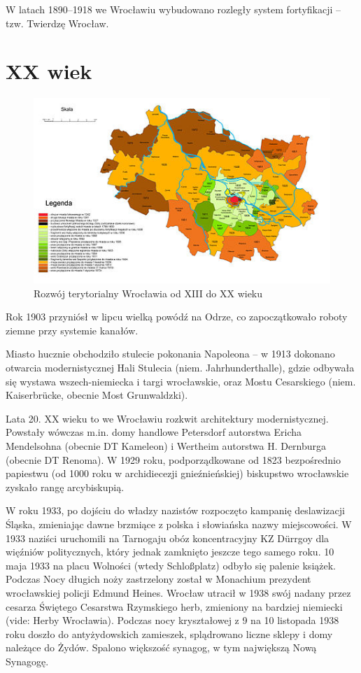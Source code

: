 \documentclass{article}
\begin{document}
W latach 1890–1918 we Wrocławiu wybudowano rozległy system fortyfikacji – tzw. Twierdzę Wrocław.

\section{XX wiek}
\hrulefill
 \begin{figure}[h!]
\centering
\includegraphics[scale=1]{12.jpg}
\caption{Rozwój terytorialny Wrocławia od XIII do XX wieku}
\end{figure}

Rok 1903 przyniósł w lipcu wielką powódź na Odrze, co zapoczątkowało roboty ziemne przy systemie kanałów.

Miasto hucznie obchodziło stulecie pokonania Napoleona – w 1913 dokonano otwarcia modernistycznej Hali Stulecia (niem. Jahrhunderthalle), gdzie odbywała się wystawa wszech-niemiecka i targi wrocławskie, oraz Mostu Cesarskiego (niem. Kaiserbrücke, obecnie Most Grunwaldzki).

Lata 20. XX wieku to we Wrocławiu rozkwit architektury modernistycznej. Powstały wówczas m.in. domy handlowe Petersdorf autorstwa Ericha Mendelsohna (obecnie DT Kameleon) i Wertheim autorstwa H. Dernburga (obecnie DT Renoma). W 1929 roku, podporządkowane od 1823 bezpośrednio papiestwu (od 1000 roku w archidiecezji gnieźnieńskiej) biskupstwo wrocławskie zyskało rangę arcybiskupią.

W roku 1933, po dojściu do władzy nazistów rozpoczęto kampanię deslawizacji Śląska, zmieniając dawne brzmiące z polska i słowiańska nazwy miejscowości. W 1933 naziści uruchomili na Tarnogaju obóz koncentracyjny KZ Dürrgoy dla więźniów politycznych, który jednak zamknięto jeszcze tego samego roku. 10 maja 1933 na placu Wolności (wtedy Schloßplatz) odbyło się palenie książek. Podczas Nocy długich noży zastrzelony został w Monachium prezydent wrocławskiej policji Edmund Heines. Wrocław utracił w 1938 swój nadany przez cesarza Świętego Cesarstwa Rzymskiego herb, zmieniony na bardziej niemiecki (vide: Herby Wrocławia). Podczas nocy kryształowej z 9 na 10 listopada 1938 roku doszło do antyżydowskich zamieszek, splądrowano liczne sklepy i domy należące do Żydów. Spalono większość synagog, w tym największą Nową Synagogę.
\end{document}
